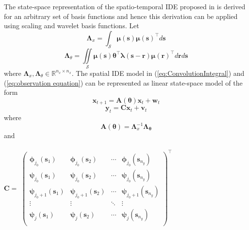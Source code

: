 \documentclass[11pt,draftcls,onecolumn,peerreview]{IEEEtran}
\begin{document}
The state-space representation of the spatio-temporal IDE proposed in \cite{Dewar2009} is derived for an arbitrary set of basis functions and hence this derivation can be applied using scaling and wavelet basis functions. Let
\begin{equation}
 \mathbf{\Lambda}_{x}=\int_{\mathcal{S}}\boldsymbol\mu\left(\mathbf{s}\right)\boldsymbol\mu\left(\mathbf{s}\right)^\top d\mathbf{s}
\label{eq:ConstructionIntegral1}
\end{equation}
\begin{equation}
 \mathbf{\Lambda}_{\theta}=\iint\limits_{\mathcal{S}}\boldsymbol\mu\left(\mathbf{s}\right)\boldsymbol\theta^\top \boldsymbol\lambda\left(\mathbf{s-r}\right)\boldsymbol\mu\left(\mathbf{r}\right)^\top d\mathbf{r}d\mathbf{s}
\label{eq:ConstructionIntegral2}
\end{equation}
where $\boldsymbol\Lambda_{x}, \boldsymbol\Lambda_{\theta} \in \mathbb{R}^{n_x \times n_x}$. The spatial IDE model in (\ref{eq:ConvolutionIntegral}) and (\ref{eq:observation equation}) can be represented as linear state-space model of the form  
\begin{equation}
 \mathbf{x}_{t+1}=\mathbf{A}\left(\boldsymbol\theta\right)\mathbf{x}_t+\mathbf{w}_t
\label{eq:StateEquation}
\end{equation}
\begin{equation}
\mathbf{y}_t=\mathbf{C}\mathbf{x}_t+\mathbf{v}_t
\label{eq:ObservationEquation}
\end{equation}
where 
\begin{equation}
 \mathbf{A}\left(\boldsymbol\theta\right)=\mathbf{\Lambda}_{x}^{-1}\mathbf{\Lambda_{\theta}}
\label{eq:TransitionMatrix}
\end{equation}
and  \\ \\ 
$\mathbf{C}=$
$\begin{pmatrix}
\boldsymbol\phi_{j_0}\left(\mathbf{s}_1\right) & \boldsymbol\phi_{j_0}\left(\mathbf{s}_2\right)  &\cdots &\boldsymbol\phi_{j_0}\left(\mathbf{s}_{n_y}\right) \\
\boldsymbol\psi_{j_0}\left(\mathbf{s}_1\right) & \boldsymbol\psi_{j_0}\left(\mathbf{s}_2\right)  &\cdots &\boldsymbol\psi_{j_0}\left(\mathbf{s}_{n_y}\right) \\
\boldsymbol\psi_{j_0+1}\left(\mathbf{s}_1\right) & \boldsymbol\psi_{j_0+1}\left(\mathbf{s}_2\right)  &\cdots &\boldsymbol\psi_{j_0+1}\left(\mathbf{s}_{n_y}\right) \\
\vdots & \vdots & \ddots& \vdots \\
\boldsymbol\psi_{j}\left(\mathbf{s}_1\right) & \boldsymbol\psi_{j}\left(\mathbf{s}_2\right)  &\cdots &\boldsymbol\psi_{j}\left(\mathbf{s}_{n_y}\right) \\
\end{pmatrix}^{\top}$ \\ \\
\end{document}

